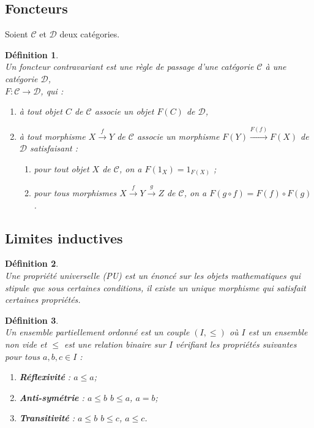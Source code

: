 \documentclass[a4paper, 14pt]{report}
\newtheorem{definition}{Définition}[section]
\begin{document}
\begin{onehalfspace}
{\subsection{Foncteurs}
Soient $\mathcal{C}$ et $\mathcal{D}$ deux catégories.
\begin{definition} \cite{maclane1971categories} \\
	Un \textit{foncteur contravariant} est une règle de passage d'une catégorie $\mathcal{C}$ à une catégorie $\mathcal{D}$, \\
	 $F : \mathcal{C} \to \mathcal{D}$, qui :
	\begin{enumerate} [label=\roman*)]
		\item à tout objet $C$ de $\mathcal{C}$ associe un objet $F(C)$ de $\mathcal{D}$,
		\item à tout morphisme $X \xrightarrow{f} Y$ de $\mathcal{C}$ associe un morphisme $F(Y) \xrightarrow{F(f)} F(X)$ de $\mathcal{D}$ satisfaisant :
		\begin{enumerate}
			\item pour tout objet $X$ de $\mathcal{C}$, on a $F(1_X) = 1_{F(X)}$ ;
			\item pour tous morphismes $X \xrightarrow{f} Y \xrightarrow{g} Z$ de $\mathcal{C}$, on a $F(g \circ f) = F(f) \circ F(g)$.
		\end{enumerate}
	\end{enumerate}
\end{definition}



\subsection{ Limites inductives}

\begin{definition} \cite {maclane1971categories}\\
Une propriété universelle (PU) est un énoncé sur les objets mathematiques qui stipule que sous certaines conditions, il existe un unique morphisme qui satisfait certaines propriétés.
\end{definition}

\begin{definition} \cite{ribes-zalesskii} \\
	Un ensemble partiellement ordonné est un couple \((I, \leq)\) où \(I\) est un ensemble non vide et \(\leq\) est une relation binaire sur \(I\) vérifiant les propriétés suivantes pour tous \(a, b, c \in I\) :
	\begin{enumerate}[label=\roman*)]
		\item \textbf{Réflexivité} : \(a \leq a\);
		\item \textbf{Anti-symétrie} :  \(a \leq b\)  \(b \leq a\),  \(a = b\);
		\item \textbf{Transitivité} :  \(a \leq b\)  \(b \leq c\),  \(a \leq c\).
	\end{enumerate}
\end{definition}


}
\end{onehalfspace}
\end{document}

